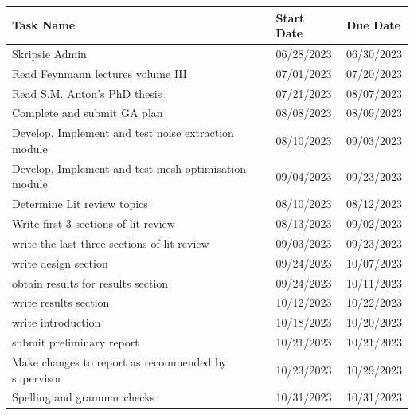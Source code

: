 \begin{table}[H]
    \centering
    \begin{tabular}{lll}
        \hline
        \textbf{Task Name}                                   & \textbf{Start Date} & \textbf{Due Date} \\ \hline
        Skripsie Admin                                       & 06/28/2023          & 06/30/2023        \\
        Read Feynmann lectures volume III                    & 07/01/2023          & 07/20/2023        \\
        Read S.M. Anton's PhD thesis                         & 07/21/2023          & 08/07/2023        \\
        Complete and submit GA plan                           & 08/08/2023          & 08/09/2023        \\
        Develop, Implement and test noise extraction module  & 08/10/2023          & 09/03/2023        \\
        Develop, Implement and test mesh optimisation module & 09/04/2023          & 09/23/2023        \\
        Determine Lit review topics                          & 08/10/2023          & 08/12/2023        \\
        Write first 3 sections of lit review                 & 08/13/2023          & 09/02/2023        \\
        write the last three sections of lit review              & 09/03/2023          & 09/23/2023        \\
        write design section                                 & 09/24/2023          & 10/07/2023        \\
        obtain results for results section                   & 09/24/2023          & 10/11/2023        \\
        write results section                                & 10/12/2023          & 10/22/2023        \\
        write introduction                                   & 10/18/2023          & 10/20/2023        \\
        submit preliminary report                            & 10/21/2023          & 10/21/2023        \\
        Make changes to report as recommended by supervisor  & 10/23/2023          & 10/29/2023        \\
        Spelling and grammar checks                          & 10/31/2023          & 10/31/2023        \\

\end{tabular}
\end{table}
